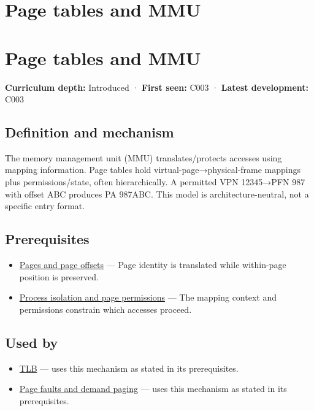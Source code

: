 \hypertarget{appendix-01e5905165c4}{}
\section*{Page tables and MMU}
\section{Page tables and MMU}\label{page-tables-and-mmu}

\textbf{Curriculum depth:} Introduced · \textbf{First seen:} C003 · \textbf{Latest development:} C003

\subsection{Definition and mechanism}\label{definition-and-mechanism}

The memory management unit (MMU) translates/protects accesses using mapping information. Page tables hold virtual-page→physical-frame mappings plus permissions/state, often hierarchically. A permitted VPN 12345→PFN 987 with offset ABC produces PA 987ABC. This model is architecture-neutral, not a specific entry format.

\subsection{Prerequisites}\label{prerequisites}

\begin{itemize}
\tightlist
\item
  \hyperref[appendix-0c67cd5bf30a]{Pages and page offsets} --- Page identity is translated while within-page position is preserved.
\item
  \hyperref[appendix-c2a9ad1e2b49]{Process isolation and page permissions} --- The mapping context and permissions constrain which accesses proceed.
\end{itemize}

\subsection{Used by}\label{used-by}

\begin{itemize}
\tightlist
\item
  \hyperref[appendix-7a2d9c5ce511]{TLB} --- uses this mechanism as stated in its prerequisites.
\item
  \hyperref[appendix-cc0909a7ef14]{Page faults and demand paging} --- uses this mechanism as stated in its prerequisites.
\end{itemize}

